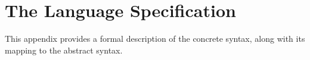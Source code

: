 \section{The Language Specification}\label{sec:spec}
%
This appendix provides a formal description of the concrete syntax, along with its mapping to the abstract syntax.